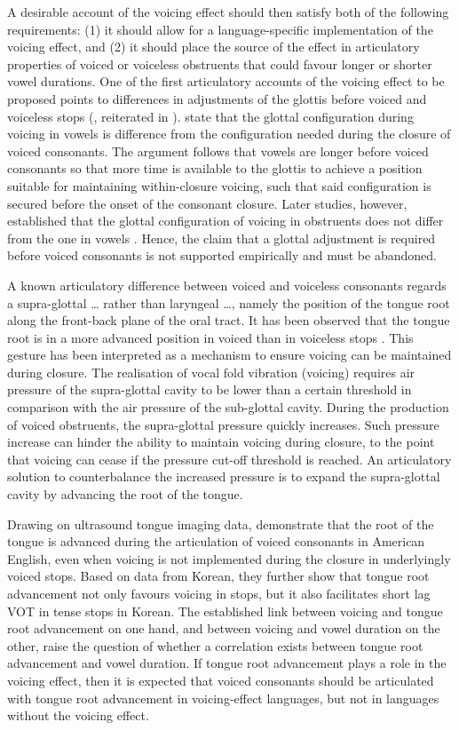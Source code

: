 \documentclass[authoryear, twocolumn]{elsarticle}
\begin{document}
A desirable account of the voicing effect should then satisfy both of
the following requirements: (1) it should allow for a language-specific
implementation of the voicing effect, and (2) it should place the source
of the effect in articulatory properties of voiced or voiceless
obstruents that could favour longer or shorter vowel durations. One of
the first articulatory accounts of the voicing effect to be proposed
points to differences in adjustments of the glottis before voiced and
voiceless stops (\citealt{halle1967}, reiterated in
\citealt{chomsky1968}). \citet{halle1967} state that the glottal
configuration during voicing in vowels is difference from the
configuration needed during the closure of voiced consonants. The
argument follows that vowels are longer before voiced consonants so that
more time is available to the glottis to achieve a position suitable for
maintaining within-closure voicing, such that said configuration is
secured before the onset of the consonant closure. Later studies,
however, established that the glottal configuration of voicing in
obstruents does not differ from the one in vowels
\citep{lisker1974,kagaya1975}. Hence, the claim that a glottal
adjustment is required before voiced consonants is not supported
empirically and must be abandoned.

A known articulatory difference between voiced and voiceless consonants
regards a supra-glottal \ldots{} rather than laryngeal \ldots{}, namely
the position of the tongue root along the front-back plane of the oral
tract. It has been observed that the tongue root is in a more advanced
position in voiced than in voiceless stops
\citep{kent1969,perkell1969,westbury1983}. This gesture has been
interpreted as a mechanism to ensure voicing can be maintained during
closure. The realisation of vocal fold vibration (voicing) requires air
pressure of the supra-glottal cavity to be lower than a certain
threshold in comparison with the air pressure of the sub-glottal cavity.
During the production of voiced obstruents, the supra-glottal pressure
quickly increases. Such pressure increase can hinder the ability to
maintain voicing during closure, to the point that voicing can cease if
the pressure cut-off threshold is reached. An articulatory solution to
counterbalance the increased pressure is to expand the supra-glottal
cavity by advancing the root of the tongue.

Drawing on ultrasound tongue imaging data, \citet{ahn2016} demonstrate
that the root of the tongue is advanced during the articulation of
voiced consonants in American English, even when voicing is not
implemented during the closure in underlyingly voiced stops. Based on
data from Korean, they further show that tongue root advancement not
only favours voicing in stops, but it also facilitates short lag VOT in
tense stops in Korean. The established link between voicing and tongue
root advancement on one hand, and between voicing and vowel duration on
the other, raise the question of whether a correlation exists between
tongue root advancement and vowel duration. If tongue root advancement
plays a role in the voicing effect, then it is expected that voiced
consonants should be articulated with tongue root advancement in
voicing-effect languages, but not in languages without the voicing
effect.
\end{document}
